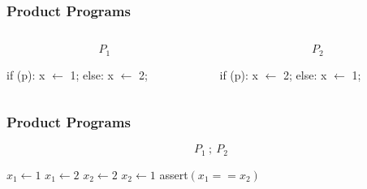 \documentclass{beamer} %
\theoremstyle{definition} %
\begin{document}
    \begin{frame}
        \frametitle{Product Programs}
        
        \begin{center}
        \begin{columns}
            \begin{column}{0.48\textwidth}
            $$P_1$$

                if (p):
                    x $\gets$ 1;
                else:
                    x $\gets$ 2;
            \end{column}
            \begin{column}{0.48\textwidth}
            $$P_2$$ 

                if (p):
                    x $\gets$ 2;
                else:
                    x $\gets$ 1;
            \end{column}
        \end{columns}
    \end{center}
    \end{frame}

    \begin{frame}
        \frametitle{Product Programs}   
        $$P_1\ ;\ P_2$$

        \begin{center}
            \begin{algorithm}[H]
                \begin{algorithmic}
                        \State $x_1 \gets 1$
                    \Else
                        \State $x_1 \gets 2$
                    \EndIf
                        \State $x_2 \gets 2$
                    \Else
                        \State $x_2 \gets 1$
                    \EndIf
                    \State \textsf{assert}$(x_1 == x_2)$
                \end{algorithmic}
            \end{algorithm}
    \end{center}
        
        \end{frame}
\end{document}
